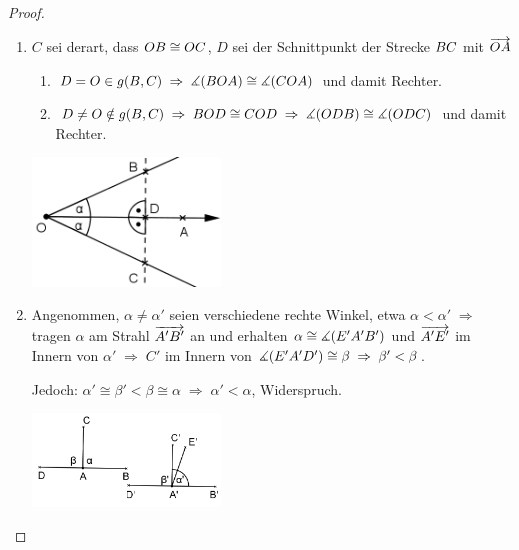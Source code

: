 \begin{proof}
    \renewcommand{\labelenumi}{\alph{enumi})} %
    \begin{enumerate}
        \item $C$ sei derart, dass ${OB} \cong {OC}$, $D$ sei der Schnittpunkt der Strecke
            ${BC}$ mit $\mbox{${\overrightarrow{OA}}$}$

            \begin{enumerate}
                \item $D = O\in g(B,C)\; \Rightarrow\; \mbox{$\measuredangle$}(BOA) \cong \mbox{$\measuredangle$}(COA)$ und damit Rechter.

                \item $D \neq O \notin g(B,C)\; \Rightarrow\; BOD \cong COD\; \Rightarrow\; \mbox{$\measuredangle$}(ODB)
                    \cong \mbox{$\measuredangle$}(ODC)$ und damit Rechter.
            \end{enumerate}

            \centerline{\includegraphics[width=5cm]{BILDER/1-2-18a-Winkel.png}}

        \item Angenommen, $\alpha \neq \alpha'$ seien verschiedene rechte Winkel, etwa $\alpha <
            \alpha'\; \Rightarrow$ tragen $\alpha$ am Strahl $\mbox{${\overrightarrow{A'B'}}$}$ an und erhalten $\alpha
            \cong \mbox{$\measuredangle$}(E'A'B')$ und $\mbox{${\overrightarrow{A'E'}}$}$ im Innern von $\alpha'\; \Rightarrow\; C'$ im Innern
            von $\mbox{$\measuredangle$}(E'A'D') \cong \beta\; \Rightarrow\; \beta' < \beta$.

            Jedoch: $\alpha' \cong \beta' < \beta \cong \alpha\; \Rightarrow\; \alpha' < \alpha$,
            Widerspruch.

            \centerline{\includegraphics[width=5cm]{BILDER/1-2-18b-Winkel.png}}
    \end{enumerate}
\end{proof}


